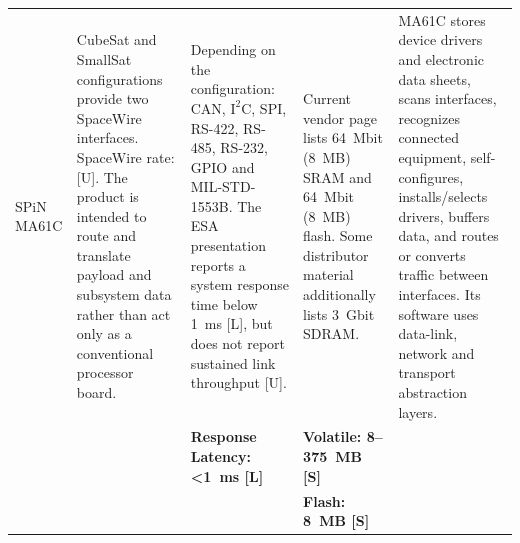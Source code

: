 \documentclass[10pt]{../datasheet}
\let\cite\citep
\begin{document}
\begin{landscape}
\begin{longtable}{|p{3.2cm}|p{4.5cm}|p{4.5cm}|p{4.5cm}|p{5.5cm}|}
    SPiN MA61C \cite{spin_ma61c_ds, spin_esa_pres}                     &
    CubeSat and SmallSat configurations provide two SpaceWire interfaces.
    SpaceWire rate: [U]. The product is intended to route and translate payload
    and subsystem data rather than act only as a conventional processor board.
                                                                       & Depending on the configuration: CAN, $\text{I}^2\text{C}$, SPI, RS-422,
    RS-485, RS-232, GPIO and MIL-STD-1553B. The ESA presentation reports a
    system response time below 1~ms [L], but does not report sustained link
    throughput [U].                                                    & Current vendor page lists 64~Mbit (8~MB) SRAM
    and 64~Mbit (8~MB) flash. Some distributor material additionally lists
    3~Gbit SDRAM.                                                      & MA61C stores device drivers
    and electronic data sheets, scans interfaces, recognizes connected
    equipment, self-configures, installs/selects drivers, buffers data, and
    routes or converts traffic between interfaces. Its software uses data-link,
    network and transport abstraction layers.
    \\
    \cline{2-5}
                                                                       &
                                                                       & \textbf{Response Latency: <1~ms [L]}
                                                                       & \textbf{Volatile: 8--375~MB [S]}                                           &                                                                                                \\
                                                                       &                                                                            &                                                  & \textbf{Flash: 8~MB [S]}                  & \\ \hline\hline


\end{longtable}
\end{landscape}
\end{document}
